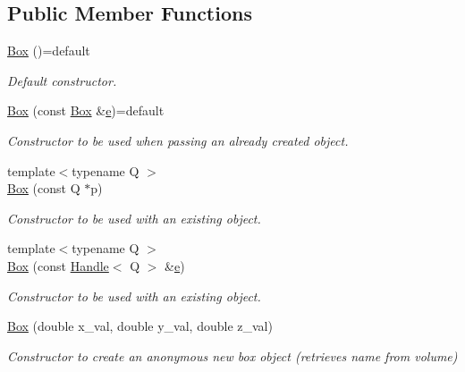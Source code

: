 \subsection*{Public Member Functions}
\begin{DoxyCompactItemize}
\item 
\hyperlink{class_d_d4hep_1_1_geometry_1_1_box_a51e906f88284765e01a30a5c562b2202}{Box} ()=default
\begin{DoxyCompactList}\small\item\em Default constructor. \end{DoxyCompactList}\item 
\hyperlink{class_d_d4hep_1_1_geometry_1_1_box_a98867373cf90b6be5409ce99a7688c3f}{Box} (const \hyperlink{class_d_d4hep_1_1_geometry_1_1_box}{Box} \&\hyperlink{_volumes_8cpp_a8a9a1f93e9b09afccaec215310e64142}{e})=default
\begin{DoxyCompactList}\small\item\em Constructor to be used when passing an already created object. \end{DoxyCompactList}\item 
{\footnotesize template$<$typename Q $>$ }\\\hyperlink{class_d_d4hep_1_1_geometry_1_1_box_a141cfb09875b7b8c33b84ff3531b753e}{Box} (const Q $\ast$p)
\begin{DoxyCompactList}\small\item\em Constructor to be used with an existing object. \end{DoxyCompactList}\item 
{\footnotesize template$<$typename Q $>$ }\\\hyperlink{class_d_d4hep_1_1_geometry_1_1_box_a4554b456409b6c51115ba0e04b32344c}{Box} (const \hyperlink{class_d_d4hep_1_1_handle}{Handle}$<$ Q $>$ \&\hyperlink{_volumes_8cpp_a8a9a1f93e9b09afccaec215310e64142}{e})
\begin{DoxyCompactList}\small\item\em Constructor to be used with an existing object. \end{DoxyCompactList}\item 
\hyperlink{class_d_d4hep_1_1_geometry_1_1_box_a81ef6c7eef4559047f89d4cd7ab10ca8}{Box} (double x\+\_\+val, double y\+\_\+val, double z\+\_\+val)
\begin{DoxyCompactList}\small\item\em Constructor to create an anonymous new box object (retrieves name from volume) \end{DoxyCompactList}\item 

\end{DoxyCompactItemize}
